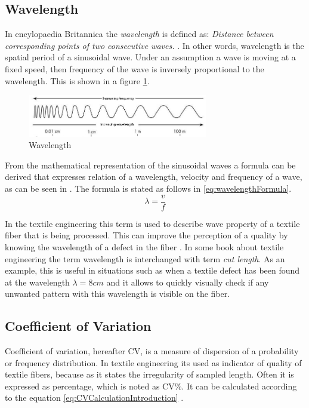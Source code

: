 \documentclass[twoside]{ctuthesis}
\theoremstyle{plain}
\theoremstyle{definition}
\theoremstyle{note}
\begin{document}
\subsection{Wavelength}
In encylopaedia Britannica the \textit{wavelength} is defined as:
\textit{Distance between corresponding points of two consecutive waves.} \cite{cite:brittanicaWavelength}. In other words, wavelength is the spatial period of a sinusoidal wave. Under an assumption a wave is moving at a fixed speed, then frequency of the wave is inversely proportional to the wavelength. This is shown in a figure \ref{fig:wavelengthExplaination}.
\begin{figure}[h]
	\centering
	\includegraphics[width=0.7\textwidth]{wavelengt_explained.jpg}
	\caption{Wavelength}
	\label{fig:wavelengthExplaination}
\end{figure}

From the mathematical representation of the sinusoidal waves a formula can be derived that expresses relation of a wavelength, velocity and frequency of a wave, as can be seen in \cite{cite:fundamentalsOfPhysics}. The formula is stated as follows in \ref{eq:wavelengthFormula}.
\begin{equation} \label{eq:wavelengthFormula}
\lambda=\frac{v}{f}
\end{equation}

In the textile engineering this term is used to describe wave property of a textile fiber that is being processed. This can improve the perception of a quality by knowing the wavelength of a defect in the fiber \cite{cite:TextileEngineering}. In some book about textile engineering the term wavelength is interchanged with term \textit{cut length}. As an example, this is useful in situations such as when a textile defect has been found at the wavelength $\lambda=8cm$ and it allows to quickly visually check if any unwanted pattern with this wavelength is visible on the fiber.

\subsection{Coefficient of Variation}
\label{sec:CoefficientOfvariation}
Coefficient of variation, hereafter CV, is a measure of dispersion of a probability or frequency distribution. In textile engineering its used as indicator of quality of textile fibers, because as it states the irregularity of sampled length. Often it is expressed as percentage, which is noted as CV\%. It can be calculated according to the equation \ref{eq:CVCalculationIntroduction} \cite{cite:fundamentalsOfSpunYarn}.
\end{document}
